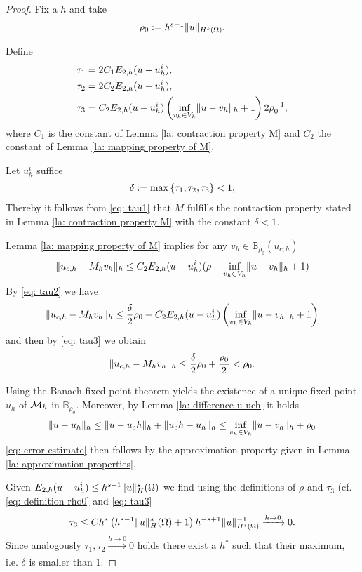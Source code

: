 \begin{proof}
	Fix a $h$ and take
	\begin{align}
		\rho_0:= h^{s-1} \lVert u \rVert_{H^{s}(\Omega)}. \label{eq: definition rho0}
	\end{align}
	
	Define 
	\begin{align}
		\tau_1 &= 2 C_1 E_{2,h}(u-u_h^i), \label{eq: tau1}\\
		\tau_2 & = 2 C_2 E_{2,h}(u-u_h^i), \label{eq: tau2}\\
		\tau_3 & = C_2 E_{2,h}(u-u_h^i) \left(\inf_{v_h \in V_h} \lVert u-v_h \rVert_{h}+1\right) 2 \rho_0^{-1} \label{eq: tau3},
	\end{align}
	where $C_1$ is the constant of Lemma \ref{la: contraction property M} and $C_2$ the constant of Lemma \ref{la: mapping property of M}. 
	
	Let $u_h^i$ suffice
	\begin{align}
		\delta := \operatorname{max} \left\{ \tau_1, \tau_2, \tau_3 \right\} < 1,
	\end{align}
	Thereby it follows from \eqref{eq: tau1} that $M$ fulfills the contraction property stated in Lemma \ref{la: contraction property M} with the constant $\delta<1$.
	
	Lemma \ref{la: mapping property of M} implies for any $v_h \in \mathbb{B}_{\rho_0}(u_{c,h})$
	 \[
	 	\lVert u_{c,h} - M_h v_h \rVert_{h} \leq 
	 		C_2 E_{2,h}(u - u^i_h) (\rho+ \inf_{v_h \in V_h} \lVert u-v_h \rVert_{h}+1) 
	 \]
	By \eqref{eq: tau2} we have 
	 \[
	 	\lVert u_{c,h} - M_h v_h \rVert_{h} \leq 
	 		\frac \delta 2 \rho_0 
	 			+ C_2  E_{2,h}(u - u^i_h) \left( \inf_{v_h \in V_h} \lVert u-v_h \rVert_{h}+1\right)
	 \]
	 and then by \eqref{eq: tau3} we obtain
	 \begin{align}
	 	\lVert u_{c,h} - M_h v_h \rVert_{h} \leq 
	 		\frac \delta 2 \rho_0 
	 		+ \frac {\rho_0} 2  < \rho_0. \label{eq: self mapping M}
	 \end{align} 
	 			 	  		 
	 Using the Banach fixed point theorem yields the existence of a unique fixed point $u_h$ of $\mathcal M_h$ in $\mathbb B_{\rho_0}$.
	 Moreover, by Lemma \ref{la: difference u uch} it holds
	 \begin{align}
	 	\lVert u-u_h \rVert_{h} \leq \lVert u-u_ch \rVert_{h} + \lVert u_ch - u_h \rVert_{h} \leq \inf_{v_h \in V_h} \lVert u-v_h \rVert_{h} +\rho_0 
	\end{align}
	\eqref{eq: error estimate} then follows by the approximation property given in Lemma \ref{la: approximation properties}.
	
	Given $E_{2,h}(u-u_h^i) \leq h^{s+1} \lVert u \rVert_H^s(\Omega)$ we find using the definitions of $\rho$ and $\tau_3$ (cf. \eqref{eq: definition rho0} and \eqref{eq: tau3}
	\begin{align*}
		\tau_3  \leq C h^{s} \left(h^{s-1} \lVert u \rVert_H^s(\Omega)+1\right) h^{-s+1} \lVert u \rVert_{H^{s}(\Omega)}^{-1} \xrightarrow{h \rightarrow 0}  0.
	\end{align*}
	Since analogously $\tau_1, \tau_2 \xrightarrow[]{h\rightarrow 0} 0$ holds there exist a $h^*$ such that their maximum, i.e. $\delta$ is smaller than 1.
\end{proof}

